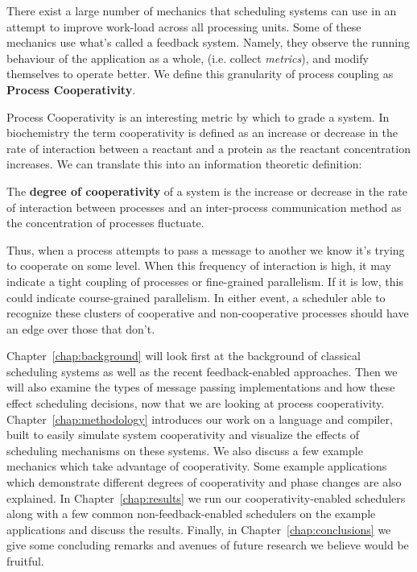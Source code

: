 There exist a large number of mechanics that scheduling systems can use in an 
attempt to improve work-load across all processing units. Some of these 
mechanics use what's called a feedback system. Namely, they observe the 
running behaviour of the application as a whole, (i.e. collect {\em metrics}),
and modify themselves to operate better. We define this granularity of process
coupling as \textbf{Process Cooperativity}.

Process Cooperativity is an interesting metric by which to grade a system. In
biochemistry the term cooperativity is defined as an increase or decrease
in the rate of interaction between a reactant and a protein as the reactant
concentration increases. We can translate this into an information theoretic 
definition: 
\begin{newdef}
    The {\bf degree of cooperativity} of a system is the increase or decrease 
    in the rate of interaction between processes and an inter-process 
    communication method as the concentration of processes fluctuate.
\end{newdef}

Thus, when a process attempts to pass a message to another we know it's trying 
to cooperate on some level. When this frequency of interaction is high, it may
indicate a tight coupling of processes or fine-grained parallelism. If it is 
low, this could indicate course-grained parallelism. In either event, a 
scheduler able to recognize these clusters of cooperative and non-cooperative 
processes should have an edge over those that don't.

Chapter~\ref{chap:background} will look first at the background of classical 
scheduling systems as well as the recent feedback-enabled approaches. Then we 
will also examine the types of message passing implementations and how these
effect scheduling decisions, now that we are looking at process cooperativity.
Chapter~\ref{chap:methodology} introduces our work on a language and compiler,
built to easily simulate system cooperativity and visualize the effects of 
scheduling mechanisms on these systems. We also discuss a few example mechanics
which take advantage of cooperativity. Some example applications which 
demonstrate different degrees of cooperativity and phase changes are also 
explained.
In Chapter~\ref{chap:results} we run our cooperativity-enabled schedulers along
with a few common non-feedback-enabled schedulers on the example applications
and discuss the results. 
Finally, in Chapter~\ref{chap:conclusions} we give some concluding remarks and
avenues of future research we believe would be fruitful.

